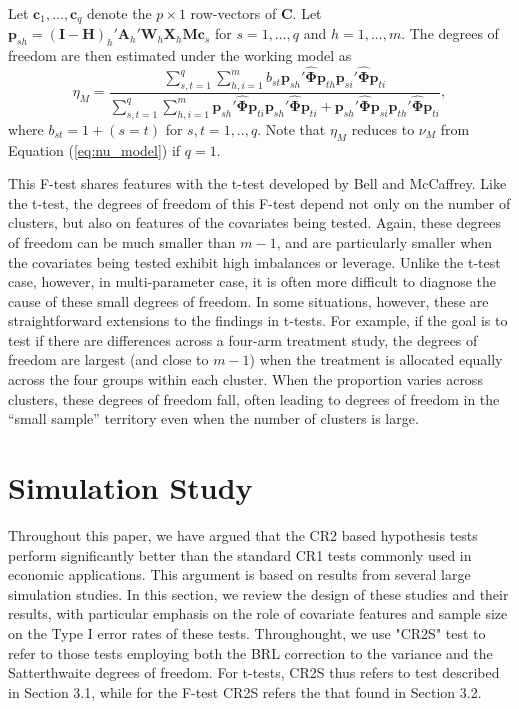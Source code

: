 \documentclass[12pt]{article}\usepackage[]{graphicx}\usepackage[]{color}
\newcommand{\bm}{\mathbf}
\newcommand{\bs}{\boldsymbol}
\begin{document}
Let $\bm{c}_1,...,\bm{c}_q$ denote the $p \times 1$ row-vectors of $\bm{C}$. 
Let $\bm{p}_{sh} = \left(\bm{I} - \bm{H}\right)_h'\bm{A}_h'\bm{W}_h\bm{X}_h\bm{M}\bm{c}_s$ for $s = 1,...,q$ and $h = 1,...,m$. 
The degrees of freedom are then estimated under the working model as
\begin{equation}
\label{eq:eta_model}
\eta_M = \frac{\sum_{s,t=1}^q \sum_{h,i=1}^m b_{st} \bm{p}_{sh}'\hat{\bs\Phi}\bm{p}_{th} \bm{p}_{si}'\hat{\bs\Phi}\bm{p}_{ti}}{\sum_{s,t=1}^q \sum_{h,i=1}^m \bm{p}_{sh}'\hat{\bs\Phi}\bm{p}_{ti} \bm{p}_{sh}'\hat{\bs\Phi}\bm{p}_{ti} + \bm{p}_{sh}'\hat{\bs\Phi}\bm{p}_{si} \bm{p}_{th}'\hat{\bs\Phi}\bm{p}_{ti}},
\end{equation}
where $b_{st} = 1 + (s=t)$ for $s,t=1,..,q$.
Note that $\eta_M$ reduces to $\nu_M$ from Equation (\ref{eq:nu_model}) if $q = 1$.

This F-test shares features with the t-test developed by Bell and McCaffrey. Like the t-test, the degrees of freedom of this F-test depend not only on the number of clusters, but also on features of the covariates being tested. 
Again, these degrees of freedom can be much smaller than $m - 1$, and are particularly smaller when the covariates being tested exhibit high imbalances or leverage. 
Unlike the t-test case, however, in multi-parameter case, it is often more difficult to diagnose the cause of these small degrees of freedom. 
In some situations, however, these are straightforward extensions to the findings in t-tests. 
For example, if the goal is to test if there are differences across a four-arm treatment study, the degrees of freedom are largest (and close to $m - 1$) when the treatment is allocated equally across the four groups within each cluster. 
When the proportion varies across clusters, these degrees of freedom fall, often leading to degrees of freedom in the ``small sample'' territory even when the number of clusters is large. 

\section{Simulation Study}

Throughout this paper, we have argued that the CR2 based hypothesis tests perform significantly better than the standard CR1 tests commonly used in economic applications. 
This argument is based on results from several large simulation studies. 
In this section, we review the design of these studies and their results, with particular emphasis on the role of covariate features and sample size on the Type I error rates of these tests.
Throughought, we use "CR2S" test to refer to those tests employing both the BRL correction to the variance and the Satterthwaite degrees of freedom. 
For t-tests, CR2S thus refers to test described in Section 3.1, while for the F-test CR2S refers the that found in Section 3.2. 
\end{document}
